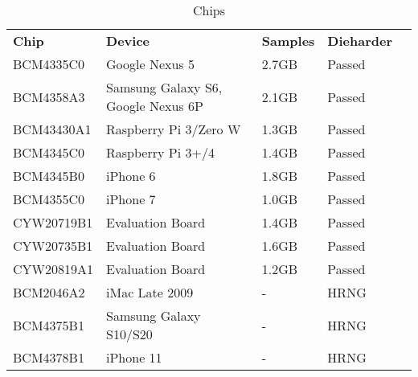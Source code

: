\documentclass{article}
\begin{document}
\begin{table}[htb]
\caption{Chips}	
	\begin{tabular}{|l|l|l|l|l}
		\cline{1-4}
		\textbf{Chip} & \textbf{Device}                      & \textbf{Samples} & \textbf{Dieharder} &  \\ \cline{1-4}
		BCM4335C0     & Google   Nexus 5                     & 2.7GB            & Passed             &  \\ \cline{1-4}
		BCM4358A3     & Samsung   Galaxy S6, Google Nexus 6P & 2.1GB            & Passed             &  \\ \cline{1-4}
		BCM43430A1    & Raspberry   Pi 3/Zero W              & 1.3GB            & Passed             &  \\ \cline{1-4}
		BCM4345C0     & Raspberry   Pi 3+/4                  & 1.4GB            & Passed             &  \\ \cline{1-4}
		BCM4345B0     & iPhone 6                             & 1.8GB            & Passed             &  \\ \cline{1-4}
		BCM4355C0     & iPhone 7                             & 1.0GB            & Passed             &  \\ \cline{1-4}
		CYW20719B1    & Evaluation   Board                   & 1.4GB            & Passed             &  \\ \cline{1-4}
		CYW20735B1    & Evaluation   Board                   & 1.6GB            & Passed             &  \\ \cline{1-4}
		CYW20819A1    & Evaluation   Board                   & 1.2GB            & Passed             &  \\ \cline{1-4}
		BCM2046A2     & iMac Late   2009                     & -                & HRNG               &  \\ \cline{1-4}
		BCM4375B1     & Samsung   Galaxy S10/S20             & -                & HRNG               &  \\ \cline{1-4}
		BCM4378B1     & iPhone 11                            & -                & HRNG               &  \\ \cline{1-4}
	\end{tabular}
\end{table}
\end{document}
